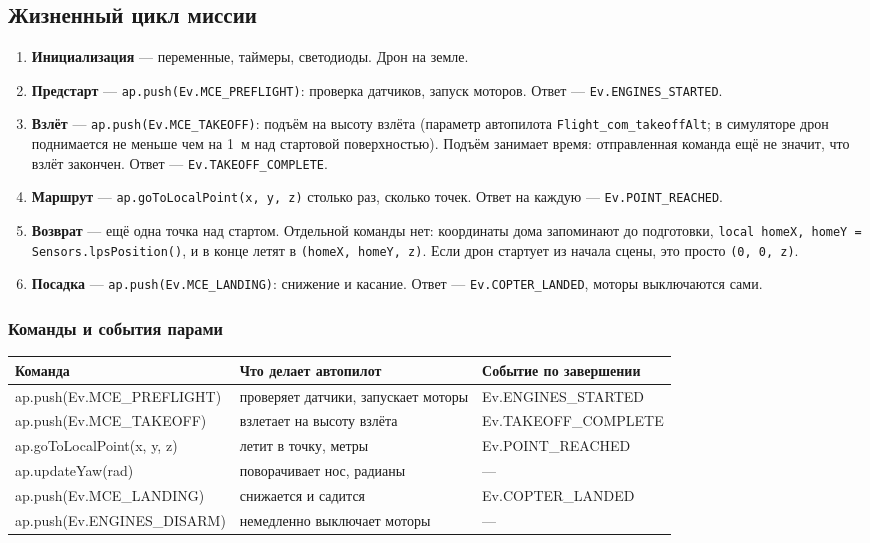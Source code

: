 \subsection{Жизненный цикл миссии}

\begin{infobox}
\begin{enumerate}
    \item \textbf{Инициализация} --- переменные, таймеры, светодиоды. Дрон на земле.
    \item \textbf{Предстарт} --- \verb|ap.push(Ev.MCE_PREFLIGHT)|: проверка датчиков, запуск моторов. Ответ --- \verb|Ev.ENGINES_STARTED|.
    \item \textbf{Взлёт} --- \verb|ap.push(Ev.MCE_TAKEOFF)|: подъём на высоту взлёта (параметр автопилота \verb|Flight_com_takeoffAlt|; в симуляторе дрон поднимается не меньше чем на 1~м над стартовой поверхностью). Подъём занимает время: отправленная команда ещё не значит, что взлёт закончен. Ответ --- \verb|Ev.TAKEOFF_COMPLETE|.
    \item \textbf{Маршрут} --- \verb|ap.goToLocalPoint(x, y, z)| столько раз, сколько точек. Ответ на каждую --- \verb|Ev.POINT_REACHED|.
    \item \textbf{Возврат} --- ещё одна точка над стартом. Отдельной команды нет: координаты дома запоминают до подготовки, \verb|local homeX, homeY = Sensors.lpsPosition()|, и в конце летят в \verb|(homeX, homeY, z)|. Если дрон стартует из начала сцены, это просто \verb|(0, 0, z)|.
    \item \textbf{Посадка} --- \verb|ap.push(Ev.MCE_LANDING)|: снижение и касание. Ответ --- \verb|Ev.COPTER_LANDED|, моторы выключаются сами.
\end{enumerate}
\end{infobox}

\subsubsection*{Команды и события парами}

\begin{center}
\small
\begin{tabularx}{\linewidth}{@{}>{\ttfamily}l X >{\ttfamily}l@{}}
\toprule
\normalfont\textbf{Команда} & \textbf{Что делает автопилот} & \normalfont\textbf{Событие по завершении} \\
\midrule
ap.push(Ev.MCE\_PREFLIGHT) & проверяет датчики, запускает моторы & Ev.ENGINES\_STARTED \\
ap.push(Ev.MCE\_TAKEOFF) & взлетает на высоту взлёта & Ev.TAKEOFF\_COMPLETE \\
ap.goToLocalPoint(x, y, z) & летит в точку, метры & Ev.POINT\_REACHED \\
ap.updateYaw(rad) & поворачивает нос, радианы & --- \\
ap.push(Ev.MCE\_LANDING) & снижается и садится & Ev.COPTER\_LANDED \\
ap.push(Ev.ENGINES\_DISARM) & немедленно выключает моторы & --- \\
\bottomrule
\end{tabularx}
\end{center}

